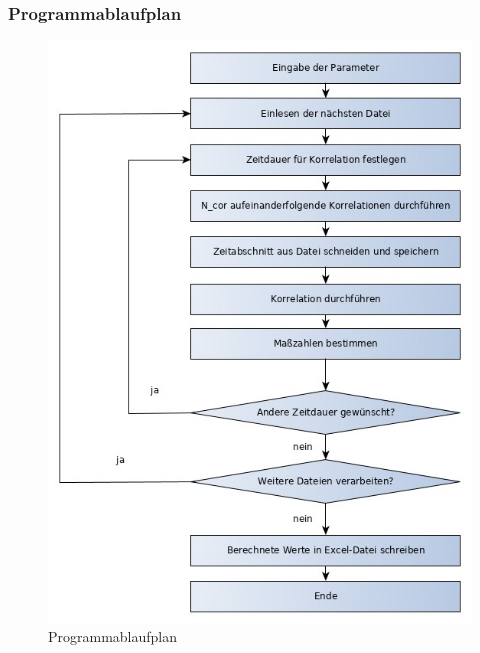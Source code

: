 \subsubsection{Programmablaufplan}
\begin{figure}[ht!]
\centering
\includegraphics[scale=0.6]{img/pap}
\caption{Programmablaufplan}
\label{figure1}
\end{figure}

